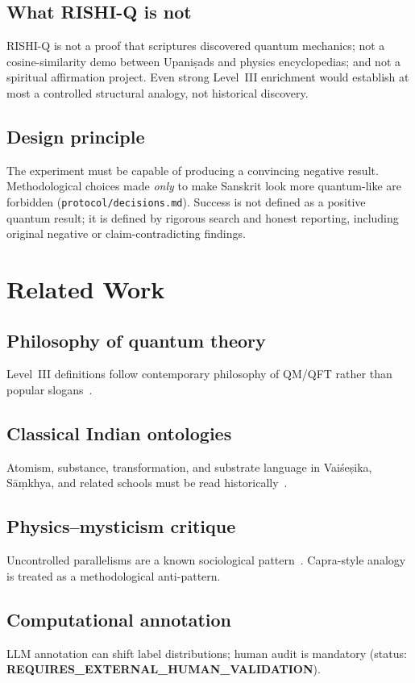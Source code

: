 \documentclass[11pt]{article}
\begin{document}
\subsection{What RISHI-Q is not}
RISHI-Q is not a proof that scriptures discovered quantum mechanics; not a cosine-similarity demo between Upani\d{s}ads and physics encyclopedias; and not a spiritual affirmation project.
Even strong Level~III enrichment would establish at most a controlled structural analogy, not historical discovery.

\subsection{Design principle}
The experiment must be capable of producing a convincing negative result.
Methodological choices made \emph{only} to make Sanskrit look more quantum-like are forbidden (\texttt{protocol/decisions.md}).
Success is not defined as a positive quantum result; it is defined by rigorous search and honest reporting, including original negative or claim-contradicting findings.

\section{Related Work}
\subsection{Philosophy of quantum theory}
Level~III definitions follow contemporary philosophy of QM/QFT rather than popular slogans~\cite{lewis2016,maudlin2019,wallace2012,ruetsche2011,weinberg1995qft}.

\subsection{Classical Indian ontologies}
Atomism, substance, transformation, and substrate language in Vai\'se\d{s}ika, S\={a}\d{m}khya, and related schools must be read historically~\cite{halbfass1992,potter1977,larson1987}.

\subsection{Physics--mysticism critique}
Uncontrolled parallelisms are a known sociological pattern~\cite{restivo1983,capra1975}.
Capra-style analogy is treated as a methodological anti-pattern.

\subsection{Computational annotation}
LLM annotation can shift label distributions; human audit is mandatory (status: \textbf{REQUIRES\_EXTERNAL\_HUMAN\_VALIDATION}).
\end{document}
